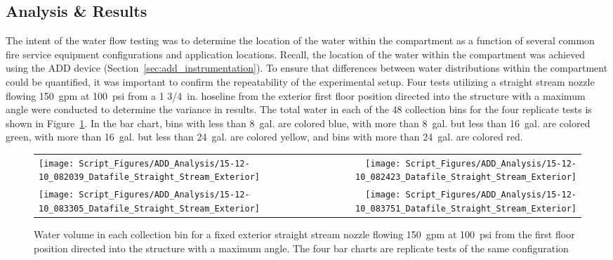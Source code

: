 \documentclass{article}
\begin{document}
\clearpage

\subsection{Analysis \& Results}

The intent of the water flow testing was to determine the location of the water within the compartment as a function of several common fire service equipment configurations and application locations. Recall, the location of the water within the compartment was achieved using the ADD device (Section~\ref{sec:add_instrumentation}). To ensure that differences between water distributions within the compartment could be quantified, it was important to confirm the repeatability of the experimental setup. Four tests utilizing a straight stream nozzle flowing 150~gpm at 100~psi from a 1 3/4~in. hoseline from the exterior first floor position directed into the structure with a maximum angle were conducted to determine the variance in results. The total water in each of the 48 collection bins for the four replicate tests is shown in Figure~\ref{fig:Repeatability_Testing}. In the bar chart, bins with less than 8~gal. are colored blue, with more than 8~gal. but less than 16~gal. are colored green, with more than 16~gal. but less than 24~gal. are colored yellow, and bins with more than 24~gal. are colored red. 

\begin{figure}[ht]
\begin{tabular*}{\textwidth}{lr}
\texttt{[image: Script\_Figures/ADD\_Analysis/15-12-10\_082039\_Datafile\_Straight\_Stream\_Exterior]} &
\texttt{[image: Script\_Figures/ADD\_Analysis/15-12-10\_082423\_Datafile\_Straight\_Stream\_Exterior]} \\
\texttt{[image: Script\_Figures/ADD\_Analysis/15-12-10\_083305\_Datafile\_Straight\_Stream\_Exterior]} &
\texttt{[image: Script\_Figures/ADD\_Analysis/15-12-10\_083751\_Datafile\_Straight\_Stream\_Exterior]} \\
\end{tabular*}
\caption{Water volume in each collection bin for a fixed exterior straight stream nozzle flowing 150~gpm at 100~psi from the first floor position directed into the structure with a maximum angle. The four bar charts are replicate tests of the same configuration}
\label{fig:Repeatability_Testing}
\end{figure}
\end{document}
